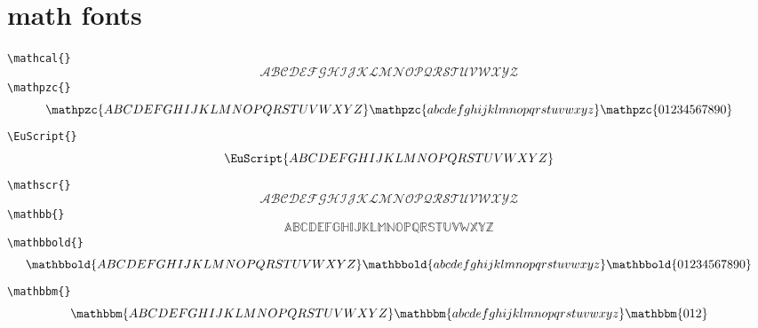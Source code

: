 \section{math fonts}

\verb|\mathcal{}|
\begin{equation}
\mathcal{ABCDEFGHIJKLMNOPQRSTUVWXYZ}
\end{equation}
\verb|\mathpzc{}|
\begin{equation}
\mathpzc{ABCDEFGHIJKLMNOPQRSTUVWXYZ}
\mathpzc{abcdefghijklmnopqrstuvwxyz}
\mathpzc{01234567890}
\end{equation}
\verb|\EuScript{}|
\begin{equation}
\EuScript{ABCDEFGHIJKLMNOPQRSTUVWXYZ}
\end{equation}
\verb|\mathscr{}|
\begin{equation}
\mathscr{ABCDEFGHIJKLMNOPQRSTUVWXYZ}
\end{equation}
\verb|\mathbb{}|
\begin{equation}
\mathbb{ABCDEFGHIJKLMNOPQRSTUVWXYZ}
\end{equation}
\verb|\mathbbold{}|
\begin{equation}
\mathbbold{ABCDEFGHIJKLMNOPQRSTUVWXYZ}
\mathbbold{abcdefghijklmnopqrstuvwxyz}
\mathbbold{01234567890}
\end{equation}
\verb|\mathbbm{}|
\begin{equation}
\mathbbm{ABCDEFGHIJKLMNOPQRSTUVWXYZ}
\mathbbm{abcdefghijklmnopqrstuvwxyz}
\mathbbm{012}
\end{equation}

